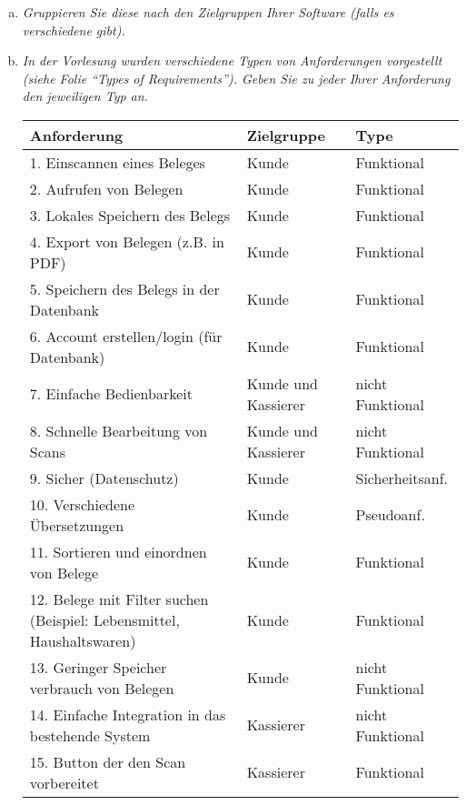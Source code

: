 \begin{enumerate} [a)]

    \item {\itshape Gruppieren Sie diese nach den Zielgruppen Ihrer Software (falls es verschiedene gibt).}
    
    \item {\itshape In  der  Vorlesung  wurden  verschiedene  Typen  von  Anforderungen  vorgestellt  (siehe Folie “Types of Requirements”). Geben Sie zu jeder Ihrer Anforderung den jeweiligen Typ an.}
    
    \begin{tabular}{l|l|l}
        \textbf{Anforderung} & \textbf{Zielgruppe} & \textbf{Type}\\ 
        \hline  
        1. Einscannen eines Beleges & Kunde & Funktional \\
        2. Aufrufen von Belegen & Kunde & Funktional \\
        3. Lokales Speichern des Belegs & Kunde & Funktional \\
        4. Export von Belegen (z.B. in PDF) & Kunde & Funktional \\
        5. Speichern des Belegs in der Datenbank & Kunde & Funktional \\
        6. Account erstellen/login (für Datenbank) & Kunde & Funktional \\
        7. Einfache Bedienbarkeit & Kunde und Kassierer & nicht Funktional \\
        8. Schnelle Bearbeitung von Scans & Kunde und Kassierer & nicht Funktional \\
        9. Sicher (Datenschutz) & Kunde & Sicherheitsanf. \\
        10. Verschiedene Übersetzungen & Kunde & Pseudoanf. \\
        11. Sortieren und einordnen von Belege & Kunde & Funktional \\
        12. Belege mit Filter suchen (Beispiel: Lebensmittel, Haushaltswaren) & Kunde & Funktional \\
        13. Geringer Speicher verbrauch von Belegen & Kunde & nicht Funktional \\
        14. Einfache Integration in das bestehende System & Kassierer & nicht Funktional \\
        15. Button der den Scan vorbereitet & Kassierer & Funktional \\
    \end{tabular}
    
\end{enumerate}



